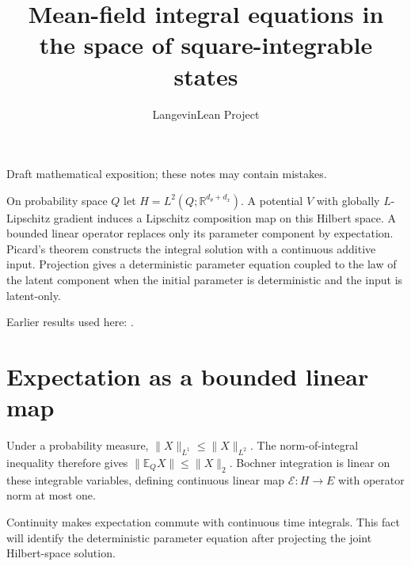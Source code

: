 \documentclass[11pt,a4paper]{article}
\title{\texorpdfstring{Mean-field integral equations in the space of square-integrable states}{Mean-field integral equations in the space of square-integrable states}}
\author{LangevinLean Project}
\date{}
\begin{document}
\maketitle
Draft mathematical exposition; these notes may contain mistakes.


On probability space \(Q\) let \(H=L^2(Q;\mathbb R^{d_\theta+d_x})\). A potential \(V\) with globally \(L\)-Lipschitz gradient induces a Lipschitz composition map on this Hilbert space. A bounded linear operator replaces only its parameter component by expectation. Picard’s theorem constructs the integral solution with a continuous additive input. Projection gives a deterministic parameter equation coupled to the law of the latent component when the initial parameter is deterministic and the input is latent-only.



Earlier results used here: \cite[Section~3.25]{LangevinLean2026ULASC}.

\section{\texorpdfstring{Expectation as a bounded linear map}{Expectation as a bounded linear map}}


Under a probability measure, \(\|X\|_{L^1}\le\|X\|_{L^2}\). The norm-of-integral inequality therefore gives \(\|\mathbb E_Q X\|\le\|X\|_2\). Bochner integration is linear on these integrable variables, defining continuous linear map \(\mathcal E:H\to E\) with operator norm at most one.



Continuity makes expectation commute with continuous time integrals. This fact will identify the deterministic parameter equation after projecting the joint Hilbert-space solution.
\end{document}
